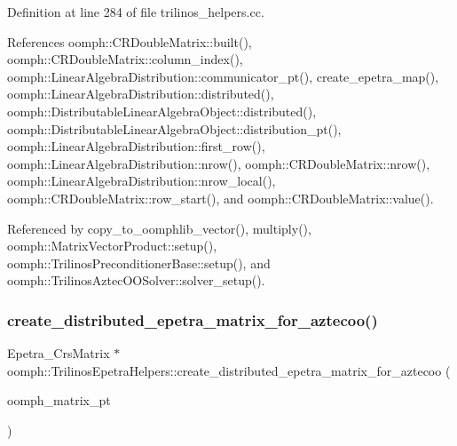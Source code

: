 Definition at line 284 of file trilinos\+\_\+helpers.\+cc.



References oomph\+::\+C\+R\+Double\+Matrix\+::built(), oomph\+::\+C\+R\+Double\+Matrix\+::column\+\_\+index(), oomph\+::\+Linear\+Algebra\+Distribution\+::communicator\+\_\+pt(), create\+\_\+epetra\+\_\+map(), oomph\+::\+Linear\+Algebra\+Distribution\+::distributed(), oomph\+::\+Distributable\+Linear\+Algebra\+Object\+::distributed(), oomph\+::\+Distributable\+Linear\+Algebra\+Object\+::distribution\+\_\+pt(), oomph\+::\+Linear\+Algebra\+Distribution\+::first\+\_\+row(), oomph\+::\+Linear\+Algebra\+Distribution\+::nrow(), oomph\+::\+C\+R\+Double\+Matrix\+::nrow(), oomph\+::\+Linear\+Algebra\+Distribution\+::nrow\+\_\+local(), oomph\+::\+C\+R\+Double\+Matrix\+::row\+\_\+start(), and oomph\+::\+C\+R\+Double\+Matrix\+::value().



Referenced by copy\+\_\+to\+\_\+oomphlib\+\_\+vector(), multiply(), oomph\+::\+Matrix\+Vector\+Product\+::setup(), oomph\+::\+Trilinos\+Preconditioner\+Base\+::setup(), and oomph\+::\+Trilinos\+Aztec\+O\+O\+Solver\+::solver\+\_\+setup().

\mbox{\label{namespaceoomph_1_1TrilinosEpetraHelpers_a1b96bb02b661a770a7b5830af771a249}} 
\subsubsection{\texorpdfstring{create\+\_\+distributed\+\_\+epetra\+\_\+matrix\+\_\+for\+\_\+aztecoo()}{create\_distributed\_epetra\_matrix\_for\_aztecoo()}}
{\footnotesize\ttfamily Epetra\+\_\+\+Crs\+Matrix $\ast$ oomph\+::\+Trilinos\+Epetra\+Helpers\+::create\+\_\+distributed\+\_\+epetra\+\_\+matrix\+\_\+for\+\_\+aztecoo (\begin{DoxyParamCaption}\item[{\hyperlink{classoomph_1_1CRDoubleMatrix}{C\+R\+Double\+Matrix} $\ast$}]{oomph\+\_\+matrix\+\_\+pt }\end{DoxyParamCaption})}



